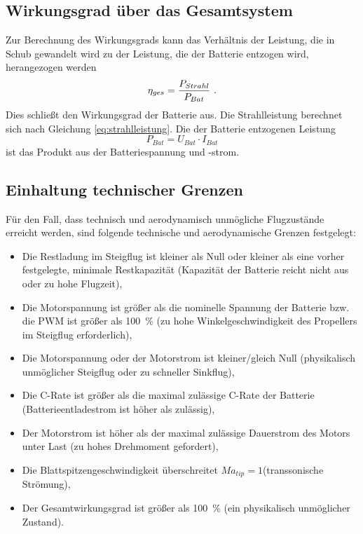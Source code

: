\subsection{Wirkungsgrad über das Gesamtsystem}
\label{subsec:eta_ges}
Zur Berechnung des Wirkungsgrads kann das Verhältnis der Leistung, die in Schub gewandelt wird zu der Leistung, die der Batterie entzogen wird, herangezogen werden
\begin{equation}
	\eta_{ges} = \frac{P_{Strahl}}{P_{Bat}} ~\text{.}
\end{equation}
Dies schließt den Wirkungsgrad der Batterie aus.
Die Strahlleistung berechnet sich nach Gleichung \eqref{eq:strahlleistung}.
Die der Batterie entzogenen Leistung
\begin{equation}
	P_{Bat} = U_{Bat}\cdot I_{Bat}
\end{equation}
ist das Produkt aus der Batteriespannung und -strom.


\subsection{Einhaltung technischer Grenzen}
\label{subsec:grenzen}
Für den Fall, dass technisch und aerodynamisch unmögliche Flugzustände erreicht werden, sind folgende technische und aerodynamische Grenzen festgelegt:
\begin{itemize}
	\item Die Restladung im Steigflug ist kleiner als  Null oder kleiner als eine vorher festgelegte, minimale Restkapazität (Kapazität der Batterie reicht nicht aus oder zu hohe Flugzeit),
	\item Die Motorspannung ist größer als die nominelle Spannung der Batterie bzw. die PWM ist größer als \SI{100}{\%} (zu hohe Winkelgeschwindigkeit des Propellers im Steigflug erforderlich),
	\item Die Motorspannung oder der Motorstrom ist kleiner/gleich Null (physikalisch unmöglicher Steigflug oder zu schneller Sinkflug),
	\item Die C-Rate ist größer als die maximal zulässige C-Rate der Batterie (Batterieentladestrom ist höher als zulässig),
	\item Der Motorstrom ist höher als der maximal zulässige Dauerstrom des Motors unter Last (zu hohes Drehmoment gefordert),
	\item Die Blattspitzengeschwindigkeit überschreitet \ensuremath{Ma_{tip}=1}\;(transsonische Strömung),
	\item Der Gesamtwirkungsgrad ist größer als \SI{100}{\%} \;(ein physikalisch unmöglicher Zustand).
\end{itemize}

